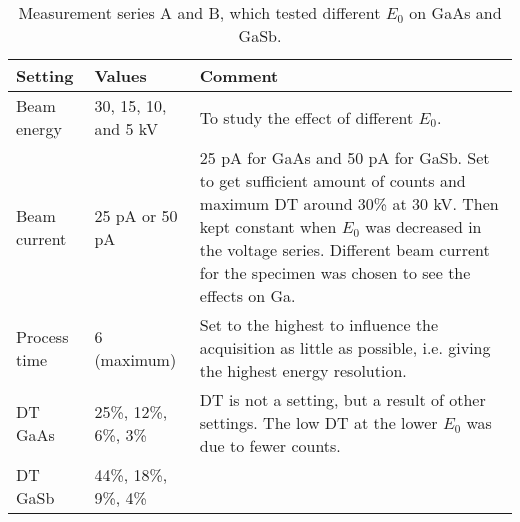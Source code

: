 \begin{table}[htbp]
    \begin{center}
        \caption{
            Measurement series A and B, which tested different $E_0$ on GaAs and GaSb.
        }
        \renewcommand*{\arraystretch}{1.2}
        \label{tab:method:acquisition_settings:voltage}
        \begin{tabular}{p{2cm}p{3cm}p{8.6cm}}
            \hline
            \textbf{Setting}    & \textbf{Values}      & \textbf{Comment}                                                                                                                                                                                                                                               \\
            \hline
            Beam energy         & 30, 15, 10, and 5 kV & To study the effect of different $E_0$.                                                                                                                                                                                                                        \\
            Beam current        & 25 pA or 50 pA       & 25 pA for GaAs and 50 pA for GaSb. Set to get sufficient amount of counts and maximum DT around 30\% at 30 kV. Then kept constant when $E_0$ was decreased in the voltage series. Different beam current for the specimen was chosen to see the effects on Ga. \\
            Process time        & 6 (maximum)          & Set to the highest to influence the acquisition as little as possible, i.e. giving the highest energy resolution.                                                                                                                                              \\
            DT GaAs             & 25\%, 12\%, 6\%, 3\% & DT is not a setting, but a result of other settings. The low DT at the lower $E_0$ was due to fewer counts.                                                                                                                                                    \\
            DT GaSb             & 44\%, 18\%, 9\%, 4\% &                                                                                                                                                                                                                                                                \\

\end{tabular}
\end{center}
\end{table}
